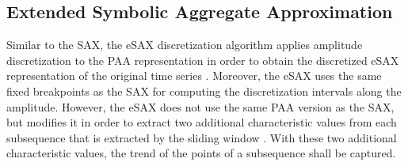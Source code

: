 \subsection{Extended Symbolic Aggregate Approximation}
Similar to the \ac{SAX}, the \ac{eSAX} discretization algorithm applies amplitude discretization to the \ac{PAA} representation in order to obtain the discretized \ac{eSAX} representation of the original time series \cite{E_SAX}. Moreover, the \ac{eSAX} uses the same fixed breakpoints as the \ac{SAX} for computing the discretization intervals along the amplitude. \newline
However, the \ac{eSAX} does not use the same \ac{PAA} version as the \ac{SAX}, but modifies it in order to extract two additional characteristic values from each subsequence that is extracted by the sliding window \cite{E_SAX}. With these two additional characteristic values, the trend of the points of a subsequence shall be captured.
